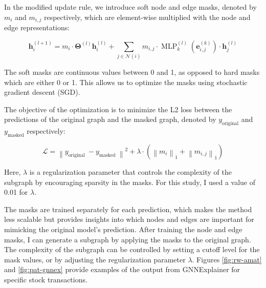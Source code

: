 \documentclass[15pt,letterpaper]{article}
\begin{document}
In the modified update rule, we introduce soft node and edge masks, denoted by $m_i$ and $m_{i,j}$ respectively, which are element-wise multiplied with the node and edge representations:

$$
\mathbf{h}_i^{(l+1)}=m_i \cdot \boldsymbol{\Theta}^{(l)} \mathbf{h}_i^{(l)}+\sum_{j \in \mathcal{N}(i)} m_{i, j} \cdot \operatorname{MLP}_k^{(l)}\left(\mathbf{e}_{i, j}^{(k)}\right) \cdot \mathbf{h}_j^{(l)}
$$

The soft masks are continuous values between 0 and 1, as opposed to hard masks which are either 0 or 1. This allows us to optimize the masks using stochastic gradient descent (SGD).

The objective of the optimization is to minimize the L2 loss between the predictions of the original graph and the masked graph, denoted by $y_{\text{original}}$ and $y_{\text{masked}}$ respectively:

$$
\mathcal{L}=\left\|y_{\text {original }}-y_{\text {masked }}\right\|^2+\lambda \cdot\left(\left\|m_i\right\|_1+\left\|m_{i, j}\right\|_1\right)
$$

Here, $\lambda$ is a regularization parameter that controls the complexity of the subgraph by encouraging sparsity in the masks. For this study, I used a value of 0.01 for $\lambda$.

The masks are trained separately for each prediction, which makes the method less scalable but provides insights into which nodes and edges are important for mimicking the original model's prediction. After training the node and edge masks, I can generate a subgraph by applying the masks to the original graph. The complexity of the subgraph can be controlled by setting a cutoff level for the mask values, or by adjusting the regularization parameter $\lambda$.
Figures \ref{fig:rw-amat} and \ref{fig:pat-gnnex} provide examples of the output from GNNExplainer for specific stock transactions.
\end{document}

